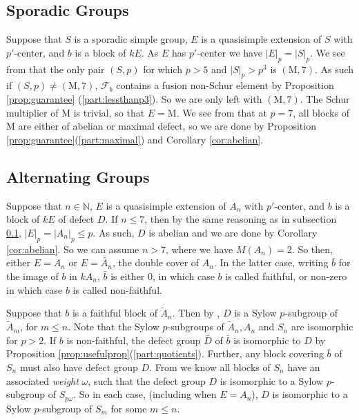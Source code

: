 \documentclass{amsart}
\theoremstyle{plain}\newtheorem{theorem}{Theorem}[section]
\theoremstyle{plain}\newtheorem{conjecture}[theorem]{Conjecture}
\theoremstyle{plain}\newtheorem{corollary}[theorem]{Corollary}
\theoremstyle{plain}\newtheorem{lemma}[theorem]{Lemma}
\theoremstyle{plain}\newtheorem{proposition}[theorem]{Proposition}
\theoremstyle{plain}\newtheorem{statement}[theorem]{}
\theoremstyle{definition}\newtheorem{definition}[theorem]{Definition}
\theoremstyle{definition}\newtheorem{example}[theorem]{Example}
\theoremstyle{definition}\newtheorem{examples}[theorem]{Examples}
\theoremstyle{definition}\newtheorem{notation}[theorem]{Notation}
\theoremstyle{definition}\newtheorem{remark}[theorem]{Remark}
\theoremstyle{definition}\newtheorem{remarks}[theorem]{Remarks}
\theoremstyle{definition}\newtheorem{question}[theorem]{Question}
\theoremstyle{definition}\newtheorem{propositiondefinition}[theorem]{Definition/Proposition}
\begin{document}
\subsection{Sporadic Groups}\label{sec:sporadic} Suppose that $S$ is a sporadic simple group, $E$ is a quasisimple extension of $S$ with $p'$-center, and $b$ is a block of $kE$. As $E$ has $p'$-center we have $|E|_p = |S|_p$. We see from \cite{ATLAS} that the only pair $(S, p)$ for which $p>5$ and $|S|_p>p^3$ is $(\mathrm{M},7)$. As such if $(S,p) \not= (\mathrm{M},7)$, $\mathcal{F}_b$ contains a fusion non-Schur element by Proposition \ref{prop:guarantee} (\ref{part:lessthanp3}). So we are only left with $(\mathrm{M},7)$. The Schur multiplier of $\mathrm{M}$ is trivial, so that $E = \mathrm{M}$. We see from \cite[Table 5.4]{WLA} that at $p=7$, all blocks of $\mathrm{M}$ are either of abelian or maximal defect, so we are done by Proposition \ref{prop:guarantee}(\ref{part:maximal}) and Corollary \ref{cor:abelian}. 
\subsection{Alternating Groups} Suppose that $n \in \mathbb{N}$, $E$ is a quasisimple extension of $A_n$ with $p'$-center, and $b$ is a block of $kE$ of defect $D$. If $n\leq 7$, then by the same reasoning as in subsection \ref{sec:sporadic}, $|E|_p = |A_n|_p \leq p$. As such, $D$ is abelian and we are done by Corollary \ref{cor:abelian}. So we can assume $n>7$, where we have $M(A_n)=2$. So then, either $E =A_n$ or $E =\tilde{A_n}$, the double cover of $A_n$. In the latter case, writing $\bar{b}$ for the image of $b$ in $kA_n$, $\bar{b}$ is either $0$, in which case $b$ is called faithful, or non-zero in which case $b$ is called non-faithful. 

Suppose that $b$ is a faithful block of $\tilde{A}_n$. Then by \cite[Proposition 2.4]{Gramain}, $D$ is a Sylow $p$-subgroup of $\tilde{A}_{m}$, for $m \leq n$. Note that the Sylow $p$-subgroups of $\tilde{A}_n, A_n$ and $S_n$ are isomorphic for $p>2$. If $b$ is non-faithful, the defect group $\bar{D}$ of $\bar{b}$ is isomorphic to $D$ by Proposition \ref{prop:usefulprop}(\ref{part:quotients}). Further, any block covering $\bar{b}$ of $S_n$ must also have defect group $D$. From \cite[Theorem 7.8]{Sambale} we know all blocks of $S_n$ have an associated \emph{weight} $\omega$, such that the defect group $D$ is isomorphic to a Sylow $p$-subgroup of $S_{p\omega}$. So in each case, (including when $E=A_n$), $D$ is isomorphic to a Sylow $p$-subgroup of $S_m$ for some $m \leq n$.
\end{document}
